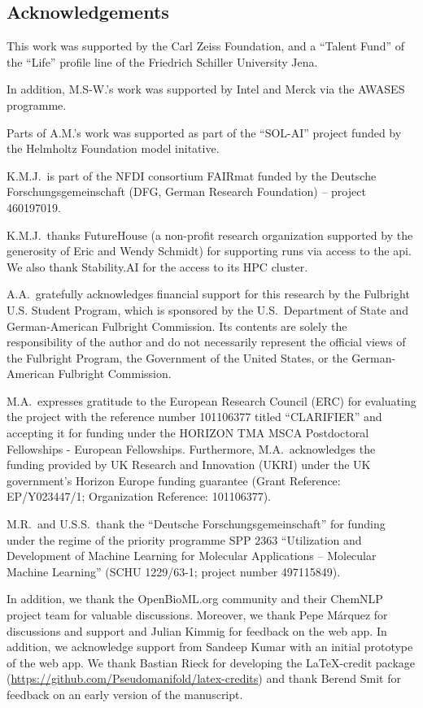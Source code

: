 \documentclass[11pt, oneside]{article}
\begin{document}
\begin{refsection}
\section*{Acknowledgements}
This work was supported by the Carl Zeiss Foundation, and a \enquote{Talent Fund} of the \enquote{Life} profile line of the Friedrich Schiller University Jena.

In addition, M.S-W.'s work was supported by Intel and Merck via the AWASES programme.

Parts of A.M.'s work was supported as part of the \enquote{SOL-AI} project funded by the Helmholtz Foundation model initative.

K.M.J.\ is part of the NFDI consortium FAIRmat funded by the Deutsche Forschungsgemeinschaft (DFG, German Research Foundation) – project 460197019.

K.M.J.\ thanks FutureHouse (a non-profit research organization supported by the generosity of Eric and Wendy Schmidt) for supporting \PaperQATwo runs via access to the \gls{api}. We also thank Stability.AI for the access to its HPC cluster.

A.A.\ gratefully acknowledges financial support for this research by the Fulbright U.S. Student Program, which is sponsored by the U.S.\ Department of State and German-American Fulbright Commission. Its contents are solely the responsibility of the author and do not necessarily represent the official views of the Fulbright Program, the Government of the United States, or the German-American Fulbright Commission.

M.A.\ expresses gratitude to the European Research Council (ERC) for evaluating the project with the reference number 101106377 titled \enquote{CLARIFIER} and accepting it for funding under the HORIZON TMA MSCA Postdoctoral Fellowships - European Fellowships.
Furthermore, M.A.\ acknowledges the funding provided by UK Research and Innovation (UKRI) under the UK government’s Horizon Europe funding guarantee (Grant Reference: EP/Y023447/1; Organization Reference: 101106377).

M.R.\ and U.S.S.\ thank the \enquote{Deutsche Forschungsgemeinschaft} for funding under the regime of the priority programme SPP 2363 \enquote{Utilization and Development of Machine Learning for Molecular Applications – Molecular Machine Learning} (SCHU 1229/63-1; project number 497115849).

In addition, we thank the OpenBioML.org community and their ChemNLP project team for valuable discussions.
Moreover, we thank Pepe Márquez for discussions and support and Julian Kimmig for feedback on the web app.
In addition, we acknowledge support from Sandeep Kumar with an initial prototype of the web app.
We thank Bastian Rieck for developing the \LaTeX-credit package (\url{https://github.com/Pseudomanifold/latex-credits}) and thank Berend Smit for feedback on an early version of the manuscript.


\end{refsection}
\end{document}
